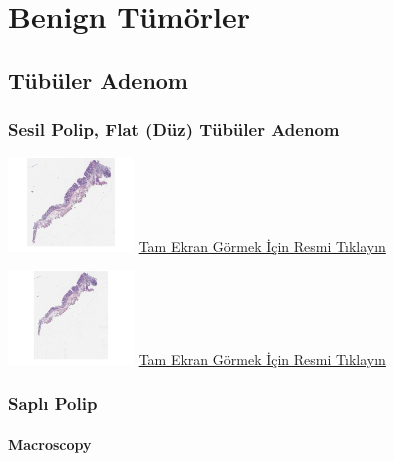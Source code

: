 \documentclass[
  letterpaper,
  DIV=11,
  numbers=noendperiod]{scrreprt}
\let\oldparagraph\paragraph
\renewcommand{\paragraph}[1]{\oldparagraph{#1}\mbox{}}
\begin{document}
\hypertarget{sec-kolon-benign-tumorler}{%
\section{Benign Tümörler}\label{sec-kolon-benign-tumorler}}

\hypertarget{sec-kolon-tubuler-adenom}{%
\subsection{Tübüler Adenom}\label{sec-kolon-tubuler-adenom}}

\hypertarget{sec-kolon-sesil-polip}{%
\subsubsection{Sesil Polip, Flat (Düz) Tübüler
Adenom}\label{sec-kolon-sesil-polip}}

\href{https://images.patolojiatlasi.com/tubularadenoma-flat/HE.html}{\includegraphics[width=0.25\textwidth,height=\textheight]{./screenshots/thumbnail_tubularadenoma-flat1.png}}
\href{https://images.patolojiatlasi.com/tubularadenoma-flat/HE.html}{Tam
Ekran Görmek İçin Resmi Tıklayın}

\href{https://images.patolojiatlasi.com/tubularadenoma-flat/HE2.html}{\includegraphics[width=0.25\textwidth,height=\textheight]{./screenshots/thumbnail_tubularadenoma-flat2.png}}
\href{https://images.patolojiatlasi.com/tubularadenoma-flat/HE2.html}{Tam
Ekran Görmek İçin Resmi Tıklayın}

\hypertarget{sec-kolon-sapli-polip}{%
\subsubsection{Saplı Polip}\label{sec-kolon-sapli-polip}}

\hypertarget{macroscopy-1}{%
\paragraph{Macroscopy}\label{macroscopy-1}}
\end{document}
